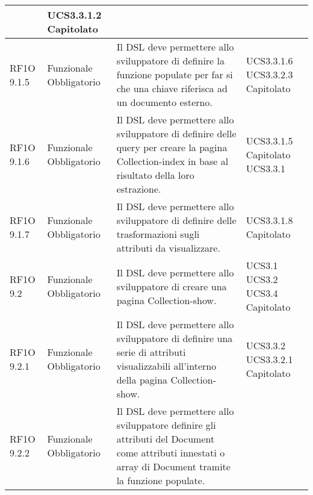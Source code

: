 \begin{center}
\begin{longtable}{ | l | p{2cm} | p{5cm} | p{1.7cm} |}
 &  UCS3.3.1.2 \newline  Capitolato \newline  \\ \hline      
        RF1O 9.1.5 & Funzionale \newline  Obbligatorio  & Il DSL deve permettere allo sviluppatore di definire la funzione populate per far si che una chiave riferisca ad un documento esterno.
 &  UCS3.3.1.6 \newline  UCS3.3.2.3 \newline  Capitolato \newline  \\ \hline      
        RF1O 9.1.6 & Funzionale \newline  Obbligatorio  & Il DSL deve permettere allo sviluppatore di definire delle query per creare la pagina Collection-index in base al risultato della loro estrazione.
 &  UCS3.3.1.5 \newline  Capitolato \newline  UCS3.3.1 \newline  \\ \hline      
        RF1O 9.1.7 & Funzionale \newline  Obbligatorio  & Il DSL deve permettere allo sviluppatore di definire delle trasformazioni sugli attributi da visualizzare. &  UCS3.3.1.8 \newline  Capitolato \newline  \\ \hline      
        RF1O 9.2 & Funzionale \newline  Obbligatorio  & Il DSL deve permettere allo sviluppatore di creare una pagina Collection-show. &  UCS3.1 \newline  UCS3.2 \newline  UCS3.4 \newline  Capitolato \newline  \\ \hline      
        RF1O 9.2.1  & Funzionale \newline  Obbligatorio  & Il DSL deve permettere allo sviluppatore di definire una serie di attributi visualizzabili all'interno della pagina Collection-show.
 &  UCS3.3.2 \newline  UCS3.3.2.1 \newline  Capitolato \newline  \\ \hline      
        RF1O 9.2.2  & Funzionale \newline  Obbligatorio  & Il DSL deve permettere allo sviluppatore definire gli attributi del Document come attributi innestati o array di Document tramite la funzione populate.

\end{longtable}
\end{center}
